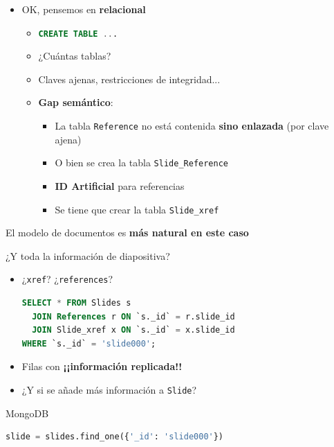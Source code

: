 \documentclass[14pt]{beamer}
\begin{document}
\begin{frame}
\begin{itemize}
\item OK, pensemos en {\bf relacional}
  \begin{itemize}
  \item \lstinline[language=sql]{CREATE TABLE ...}
  \item ¿Cuántas tablas?
  \item Claves ajenas, restricciones de integridad...
  \item {\bf Gap semántico}:
    \begin{itemize}
    \item La tabla {\tt Reference} no está contenida {\bf sino enlazada}
      (por clave ajena)
    \item O bien se crea la tabla {\tt Slide\_Reference}
    \item {\bf ID Artificial} para referencias
    \item Se tiene que crear la tabla {\tt Slide\_xref}
    \end{itemize}
  \end{itemize}

\end{itemize}

\begin{block}{El modelo de documentos es {\bf más natural en este caso}}
\end{block}

\framebreak

\begin{alertblock}{¿Y toda la información de diapositiva?}
\begin{itemize}
\begin{lstlisting}[language=sql]
SELECT * FROM Slides WHERE `_id` = 'slide000';
\end{lstlisting}
  \item ¿{\tt xref}? ¿{\tt references}?
\begin{lstlisting}[language=sql]
SELECT * FROM Slides s
  JOIN References r ON `s._id` = r.slide_id
  JOIN Slide_xref x ON `s._id` = x.slide_id
WHERE `s._id` = 'slide000';
\end{lstlisting}
\item Filas con {\bf ¡¡información replicada!!}
\item ¿Y si se añade más información a {\tt Slide}?
  \end{itemize}
\end{alertblock}

\framebreak

\begin{block}{MongoDB}
\begin{lstlisting}[language=Python]
slide = slides.find_one({'_id': 'slide000'})
\end{lstlisting}
\end{block}

\end{frame}
\end{document}
